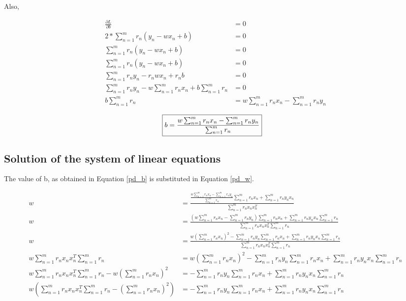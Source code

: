 \documentclass[a4paper]{article}
\begin{document}
\vspace{5mm}

Also, 

\begin{align*}
	\frac{\partial L}{\partial b} &= 0\\
	2 * \sum_{n=1}^m r_n (y_n − w x_n + b) &= 0\\
	\sum_{n=1}^m r_n (y_n − w x_n + b) &= 0\\
	\sum_{n=1}^m r_n (y_n − w x_n + b) &= 0\\
	\sum_{n=1}^m r_n y_n − r_n w x_n + r_n b &= 0\\
	\sum_{n=1}^m r_n y_n − w \sum_{n=1}^m r_n x_n + b \sum_{n=1}^m r_n &= 0\\
	b \sum_{n=1}^m r_n &= w \sum_{n=1}^m r_n x_n - \sum_{n=1}^m r_n y_n
\end{align*}

\begin{align}
\label{pd_b}
	\Aboxed{b = \frac{w \sum_{n=1}^m r_n x_n - \sum_{n=1}^m  r_n y_n}{\sum_{n=1}^m  r_n}}
\end{align}


\subsection{Solution of the system of linear equations}

The value of b, as obtained in Equation \ref{pd_b} is substituted in Equation \ref{pd_w}.

\begin{align*}
	w &= \frac{\frac{w \sum_{n=1}^m r_n x_n - \sum_{n=1}^m r_n y_n}{\sum_{n=1}^m r_n} \sum_{n=1}^m r_n x_n + \sum_{n=1}^m r_n y_n x_n} {\sum_{n=1}^m r_n x_n x_n^T}\\
	w &= \frac{(w \sum_{n=1}^m r_n x_n - \sum_{n=1}^m r_n y_n) \sum_{n=1}^m r_n x_n + \sum_{n=1}^m r_n y_n x_n \sum_{n=1}^m r_n} {\sum_{n=1}^m r_n x_n x_n^T \sum_{n=1}^m r_n}\\
	w &= \frac{w ({\sum_{n=1}^m r_n x_n})^2 - \sum_{n=1}^m r_n y_n \sum_{n=1}^m r_n x_n + \sum_{n=1}^m r_n y_n x_n \sum_{n=1}^m r_n} {\sum_{n=1}^m r_n x_n x_n^T \sum_{n=1}^m r_n}\\
	w \sum_{n=1}^m r_n x_n x_n^T \sum_{n=1}^m  r_n &= w ({\sum_{n=1}^m r_n x_n})^2 - \sum_{n=1}^m  r_n y_n \sum_{n=1}^m  r_n x_n + \sum_{n=1}^m  r_n y_n x_n \sum_{n=1}^m  r_n\\
	w \sum_{n=1}^m r_n x_n x_n^T \sum_{n=1}^m  r_n - w ({\sum_{n=1}^m r_n x_n})^2 &= - \sum_{n=1}^m  r_n y_n \sum_{n=1}^m  r_n x_n + \sum_{n=1}^m  r_n y_n x_n \sum_{n=1}^m  r_n\\
	w (\sum_{n=1}^m r_n x_n x_n^T \sum_{n=1}^m  r_n - ({\sum_{n=1}^m r_n x_n})^2) &= - \sum_{n=1}^m  r_n y_n \sum_{n=1}^m  r_n x_n + \sum_{n=1}^m  r_n y_n x_n \sum_{n=1}^m  r_n\\
\end{align*}
\end{document}
